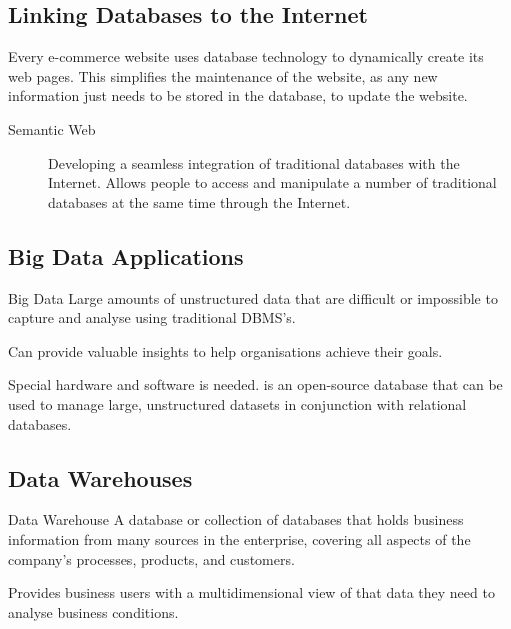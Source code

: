 \documentclass[\main/notes.tex]{subfiles}
\begin{document}
			\subsection{Linking Databases to the Internet}
				Every e-commerce website uses database technology to dynamically create its web pages. This simplifies the maintenance of the website, as any new information just needs to be stored in the database, to update the website.

				\begin{description}
					\item[Semantic Web] Developing a seamless integration of traditional databases with the Internet. Allows people to access and manipulate a number of traditional databases at the same time through the Internet.
				\end{description}
			\subsection{Big Data Applications}
				\begin{definition}{Big Data}
					Large amounts of unstructured data that are difficult or impossible to capture and analyse using traditional DBMS's.

					Can provide valuable insights to help organisations achieve their goals.

					Special hardware and software is needed.  is an open-source database that can be used to manage large, unstructured datasets in conjunction with relational databases.
				\end{definition}
			\subsection{Data Warehouses}
				\begin{definition}{Data Warehouse}
					A database or collection of databases that holds business information from many sources in the enterprise, covering all aspects of the company's processes, products, and customers.

					Provides business users with a multidimensional view of that data they need to analyse business conditions.
				\end{definition}
\end{document}
